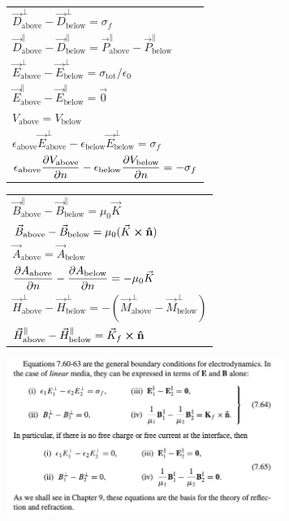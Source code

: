 \documentclass{article}
\newcommand{\ds}{\displaystyle}
\newcommand{\formbox}[2]{\begin{center} \begin{tcolorbox}[title = #1, boxrule=2pt,arc=3.4pt,boxsep=0mm] #2\end{tcolorbox}\end{center}}
\begin{document}
\begin{multicols*}{2}
    \formbox{Boundary Conditions in Electrostatics}{
        {\renewcommand{\arraystretch}{1.75}%
        \begin{tabular}{ l }
            $\vec{D}_{\text{above}}^{\perp} - \vec{D}_{\text{below}}^{\perp}  = \sigma_f$\\
            $\vec{D}_{\text{above}}^{\parallel} - \vec{D}_{\text{below}}^{\parallel} = \vec{P}_{\text{above}}^{\parallel} - \vec{P}_{\text{below}}^{\parallel}$\\
            $\vec{E}_{\text{above}}^{\perp} - \vec{E}_{\text{below}}^{\perp}  = \sigma_{\text{tot}}/\epsilon_0$\\
            $\vec{E}_{\text{above}}^{\parallel} - \vec{E}_{\text{below}}^{\parallel}  = \vec{0}$\\
            $V_\text{above} = V_\text{below}$\\
            $\epsilon_\text{above}\vec{E}_\text{above}^\perp - \epsilon_\text{below}\vec{E}_\text{below}^\perp = \sigma_f$\\
            $\ds \epsilon_\text{above}\pdv{V_\text{above}}{n} - \epsilon_\text{below}\pdv{V_\text{below}}{n} = -\sigma_f$
        \end{tabular}}
    }
    \formbox{Boundary Conditions in Magnetostatics}{
        {\renewcommand{\arraystretch}{1.75}%
        \begin{tabular}{ l }
            $\vec{B}_\text{above}^\parallel - \vec{B}_\text{below}^\parallel = \mu_0\vec{K}$\\
            $\vec{B}_\text{above} - \vec{B}_\text{below} = \mu_0(\vec{K}\cross\vu{n})$\\
            $\vec{A}_\text{above} = \vec{A}_\text{below}$\\
            $\ds \pdv{A_\text{above}}{n} - \pdv{A_\text{below}}{n} = -\mu_0\vec{K}$\\
            $\vec{H}_\text{above}^\perp - \vec{H}_\text{below}^\perp = - (\vec{M}_\text{above}^\perp - \vec{M}_\text{below}^\perp) $\\
            $\vec{H}_\text{above}^\parallel - \vec{H}_\text{below}^\parallel = \vec{K}_f \cross \vu{n}$
        \end{tabular}}
    }
    \formbox{More Boundary Conditions}{
        \begin{center}
            \includegraphics[width=9cm]{boundary-conditions.png}
        \end{center}
    }

    \vfill\null
\end{multicols*}
\end{document}
